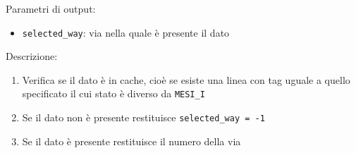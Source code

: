 Parametri di output:
\begin{itemize}
  \item \texttt{selected\_way}: via nella quale \`e presente il dato
\end{itemize}

Descrizione:	
\begin{enumerate}
  \item Verifica se il dato \`e in cache, cio\`e se esiste una linea con tag uguale a quello specificato il cui stato \`e diverso da \texttt{MESI\_I}
  \item Se il dato non \`e presente restituisce \texttt{selected\_way = -1}
  \item Se il dato \`e presente restituisce il numero della via
\end{enumerate}




